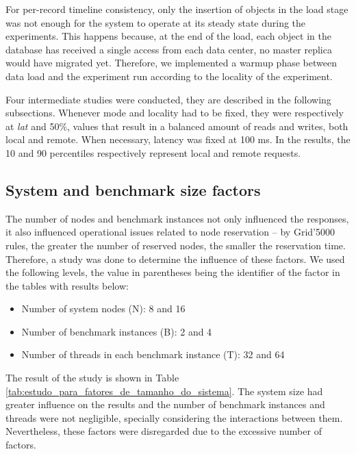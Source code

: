 \documentclass[doublespacing]{bmcart}
\begin{document}
For per-record timeline consistency, only the insertion of objects in the load stage was
not enough for the system to operate at its steady state during the experiments.
This happens because, at the end of the load, each object in the database has
received a single access from each data center, no master replica would have
migrated yet. Therefore, we implemented a warmup phase between data load and the experiment run according to the locality of the experiment.

Four intermediate studies were conducted, they are described in the following
subsections. Whenever mode and locality had to be fixed, they were respectively
at \textit{lat} and 50\%, values that result in a balanced amount of reads and
writes, both local and remote. When necessary, latency was fixed at 100 ms. In
the results, the 10 and 90 percentiles respectively represent local and remote
requests.

\subsection{System and benchmark size factors}

The number of nodes and benchmark instances not only influenced the
responses, it also influenced operational issues related to node reservation --
by Grid'5000 rules, the greater the number of reserved nodes, the smaller the
reservation time. Therefore, a study was done to determine the influence of
these factors. We used the following levels, the value in parentheses
being the identifier of the factor in the tables with results below:

\begin{itemize}

\item Number of system nodes (N): 8 and 16

\item Number of benchmark instances (B): 2 and 4

\item Number of threads in each benchmark instance (T): 32 and 64

\end{itemize}

The result of the study is shown in Table
\ref{tab:estudo_para_fatores_de_tamanho_do_sistema}. The system size had greater
influence on the results and the number of benchmark instances and threads were
not negligible, specially considering the interactions between them.
Nevertheless, these factors were disregarded due to the excessive number of
factors.
\end{document}

